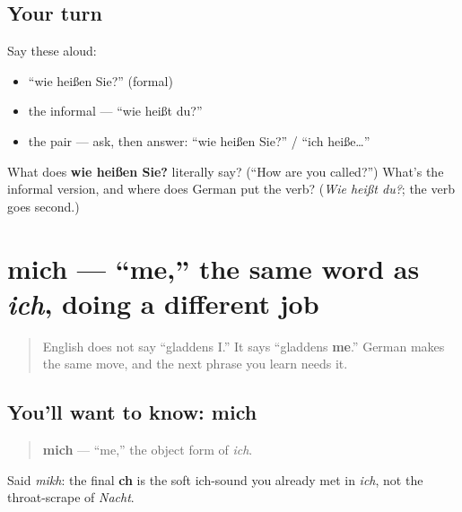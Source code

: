 \subsection*{Your turn}
Say these aloud:

\begin{itemize}
\raggedright
  \item \textquotedblleft{}wie heißen Sie?\textquotedblright{} (formal)
  \item the informal — \textquotedblleft{}wie heißt du?\textquotedblright{}
  \item the pair — ask, then answer: \textquotedblleft{}wie heißen Sie?\textquotedblright{} / \textquotedblleft{}ich heiße…\textquotedblright{}
\end{itemize}

\begin{tcolorbox}[breakable,colback=teal!4,colframe=teal!35!black,title={Before you move on}]
What does \textbf{wie heißen Sie?} literally say? (\textquotedblleft{}How are you called?\textquotedblright{}) What's the informal version, and where does German put the verb? (\emph{Wie heißt du?}; the verb goes second.)
\end{tcolorbox}
\section[mich]{mich — \textquotedblleft{}me,\textquotedblright{} the same word as \emph{ich}, doing a different job}

\label{lesson:GE-C02-mich}



\begin{quote}
English does not say \textquotedblleft{}gladdens I.\textquotedblright{} It says \textquotedblleft{}gladdens \textbf{me}.\textquotedblright{} German makes the same move, and the next phrase you learn needs it.
\end{quote}

\subsection*{You'll want to know: mich}
\begin{quote}
\textbf{mich} — \textquotedblleft{}me,\textquotedblright{} the object form of \emph{ich}.
\end{quote}

Said \emph{mikh}: the final \textbf{ch} is the soft ich-sound you already met in \emph{ich}, not the throat-scrape of \emph{Nacht}.


